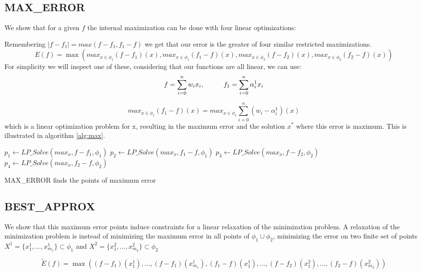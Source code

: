 \subsection{MAX\_ERROR}
We show that for a given $f$ the internal maximization can be done with four linear optimizations:

Remembering $ |f - f_1| = max (f-f_1,f_1-f)$ we get that our error is the greater of four similar restricted maximizations.
$$ E(f) =\max \left( max_{x\in \phi_1} (f - f_1) (x),
max_{x\in \phi_1} (f _1- f) (x),
max_{x\in \phi_2} (f - f_2) (x),
max_{x\in \phi_2} (f_2 - f) (x)
\right)$$
For simplicity we will inspect one of these, considering that our functions are all linear, we can use:
$$ f = \sum_{i=0}^n w_i x_i,  \mbox{\rule{1cm}{0cm}} 
f_1 = \sum_{i=0}^n \alpha_i^1 x_i$$

$$max_{x\in \phi_1} (f _1- f) (x) = max_{x\in \phi_1}\sum_{i=0}^n (w_i- \alpha_i^1) (x) $$
which is a linear optimization problem for x, resulting in the maximum error and the solution $x^*$  where this error is maximum.
This is illustrated in algorithm \ref{alg:max}.

\begin{algorithm}[!h]
\dontprintsemicolon
{}
$p_1 \gets LP\_Solve(max _x, f-f_1,\phi_1)$\;
$p_2 \gets LP\_Solve(max_x, f_1-f,\phi_1)$\;
$p_3 \gets LP\_Solve(max_x, f-f_2,\phi_2)$\;
$p_4 \gets LP\_Solve(max_x, f_2-f,\phi_2)$\;
\;
\caption{{\sc MAX\_ERROR} finds the points of maximum error}
\label{alg:max}
\end{algorithm}

\subsection{BEST\_APPROX}
We show that this maximum error points induce constraints for a linear relaxation of the minimization problem.
A relaxation of the minimization problem is instead of minimizing the maximum error in all points of $\phi_1 \cup \phi_2$, minimizing the error on two finite set of points $X^1 = \{ x^1_1, ..., x^1_{m_1} \} \subset   \phi_1$ and $X^2 = \{ x^2_1, ..., x^2_{m_2} \} \subset   \phi_2$
	
$$ \tilde{E}(f) =\max \left( (f - f_1) (x^1_1), ... , (f - f_1) (x^1_{m_1}),  (f _1- f) (x^1_1), ... ,  (f - f_2) (x^2_1), ... , (f_2 - f) (x^2_{m_2})
\right)$$


